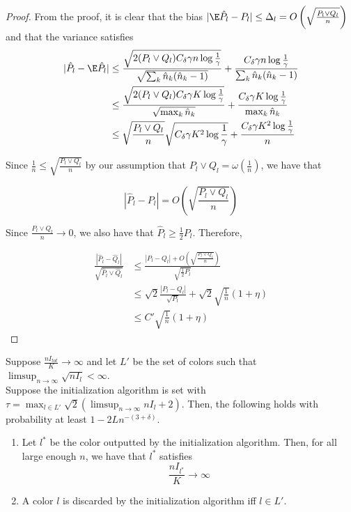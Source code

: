 \documentclass{article}
\begin{document}
\begin{proof}
From the proof, it is clear that the bias $|\E \hat{P}_l - P_l| \leq \Delta_l = O\left( 
\sqrt{ \frac{P_l \vee Q_l}{n}} \right)$ and that the variance satisfies 
\begin{align*}
|\hat{P}_l - \E \hat{P}_l | &\leq \frac{\sqrt{2 (P_l \vee Q_l) C_\delta \gamma n \log \frac{1}{\gamma}}}
             {\sqrt{ \sum_k \hat{n}_k (\hat{n}_k - 1)}} + 
          \frac{C_\delta \gamma n \log \frac{1}{\gamma}}
             {\sum_k \hat{n}_k (\hat{n}_k - 1)} \\
  &\leq \frac{\sqrt{2 (P_l \vee Q_l) C_\delta \gamma K \log \frac{1}{\gamma}}}
             {\sqrt{ \max_k \hat{n}_k}}  + 
          \frac{C_\delta \gamma K \log \frac{1}{\gamma}}
             {\max_k \hat{n}_k } \\
  &\leq \sqrt{ \frac{ P_l \vee Q_l}{n}} \sqrt{ C_\delta \gamma K^2 \log \frac{1}{\gamma}} + 
    \frac{C_\delta \gamma K^2 \log \frac{1}{\gamma}}{n} 
\end{align*}
 
Since $\frac{1}{n} \leq \sqrt{ \frac{P_l \vee Q_l}{n}}$ by our assumption that $P_l \vee Q_l = \omega \left(\frac{1}{n} \right)$, we have that

$$| \hat{P}_l - P_l | = O\left( \sqrt{\frac{P_l \vee Q_l}{n} } \right)$$ 

Since $\frac{ P_l \vee Q_l }{n} \rightarrow 0$, we also have that $\hat{P}_l \geq \frac{1}{2} P_l$. Therefore, 

\begin{align*}
\frac{ | \hat{P}_l - \hat{Q}_l |}{\sqrt{\hat{P}_l \vee \hat{Q}_l}} &\leq 
          \frac{| P_l - Q_l | + O \left( \sqrt{ \frac{P_l \vee Q_l}{n}} \right)}{ \sqrt{\frac{1}{2} P_l} } \\
  &\leq \sqrt{2} \frac{|P_l - Q_l|}{\sqrt{P_l}} + \sqrt{2} \sqrt{ \frac{1}{n}} (1 + \eta) \\
  &\leq C' \sqrt{ \frac{1}{n} } (1 + \eta)
\end{align*}

\end{proof}

\begin{theorem}
Suppose $\frac{ n I_{tot}}{K} \rightarrow \infty$ and let $L'$ be the set of colors such that $\limsup_{n \rightarrow \infty} \sqrt{n I_l} < \infty$. \\

Suppose the initialization algorithm is set with $\tau = \max_{l \in L'} \sqrt{2} 
( \limsup_{n \rightarrow \infty} n I_l  + 2)$. Then, the following holds with probability at least $1 - 2Ln^{-(3+\delta)}$.

\begin{enumerate}
\item 
Let $l^*$ be the color outputted by the initialization algorithm. Then, for all large enough $n$, we have that $l^*$ satisfies 
\[
\frac{n I_{l^*} }{K} \rightarrow \infty
\]
\item
A color $l$ is discarded by the initialization algorithm iff $l \in L'$. 
\end{enumerate}

\end{theorem}
\end{document}

